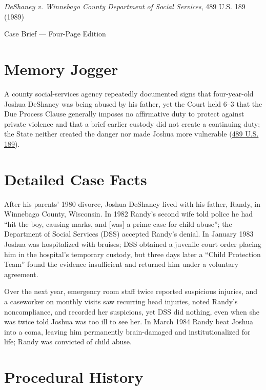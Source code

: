 \documentclass[12pt]{article}
\begin{document}
\begin{center}
{\LARGE \textit{DeShaney v. Winnebago County Department of Social Services}, 489 U.S. 189 (1989)\par}
\vspace{0.8em}
{\large Case Brief --- Four-Page Edition\par}
\end{center}
\vspace{1em}

\section{Memory Jogger}

A county social-services agency repeatedly documented signs that four-year-old Joshua DeShaney was being abused by his father, yet the Court held 6--3 that the Due Process Clause generally imposes no affirmative duty to protect against private violence and that a brief earlier custody did not create a continuing duty; the State neither created the danger nor made Joshua more vulnerable (\href{https://supreme.justia.com/cases/federal/us/489/189/}{489 U.S. 189}).

\section{Detailed Case Facts}

After his parents' 1980 divorce, Joshua DeShaney lived with his father, Randy, in Winnebago County, Wisconsin. In 1982 Randy's second wife told police he had ``hit the boy, causing marks, and [was] a prime case for child abuse''; the Department of Social Services (DSS) accepted Randy's denial. In January 1983 Joshua was hospitalized with bruises; DSS obtained a juvenile court order placing him in the hospital's temporary custody, but three days later a ``Child Protection Team'' found the evidence insufficient and returned him under a voluntary agreement.

Over the next year, emergency room staff twice reported suspicious injuries, and a caseworker on monthly visits saw recurring head injuries, noted Randy's noncompliance, and recorded her suspicions, yet DSS did nothing, even when she was twice told Joshua was too ill to see her. In March 1984 Randy beat Joshua into a coma, leaving him permanently brain-damaged and institutionalized for life; Randy was convicted of child abuse.

\section{Procedural History}
\end{document}
